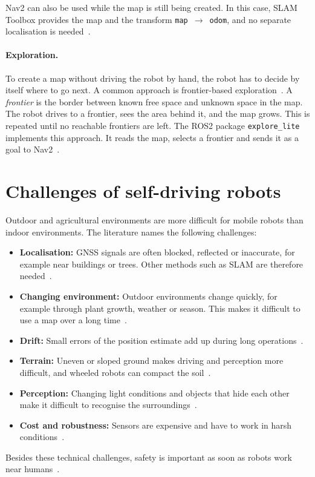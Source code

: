 Nav2 can also be used while the map is still being created. In this case, SLAM Toolbox provides the map and the transform \texttt{map}~$\rightarrow$~\texttt{odom}, and no separate localisation is needed~\citep{nav2_slam}.

\paragraph{Exploration.} To create a map without driving the robot by hand, the robot has to decide by itself where to go next. A common approach is frontier-based exploration~\citep{yamauchi1997}. A \emph{frontier} is the border between known free space and unknown space in the map. The robot drives to a frontier, sees the area behind it, and the map grows. This is repeated until no reachable frontiers are left. The ROS2 package \texttt{explore\_lite} implements this approach. It reads the map, selects a frontier and sends it as a goal to Nav2~\citep{m_explore}.

\section{Challenges of self-driving robots}
\label{sec:challenges}

Outdoor and agricultural environments are more difficult for mobile robots than indoor environments. The literature names the following challenges:
\begin{itemize}
  \item \textbf{Localisation:} GNSS signals are often blocked, reflected or inaccurate, for example near buildings or trees. Other methods such as SLAM are therefore needed~\citep{aguiar2020,oliveira2021}.
  \item \textbf{Changing environment:} Outdoor environments change quickly, for example through plant growth, weather or season. This makes it difficult to use a map over a long time~\citep{aguiar2020}.
  \item \textbf{Drift:} Small errors of the position estimate add up during long operations~\citep{aguiar2020}.
  \item \textbf{Terrain:} Uneven or sloped ground makes driving and perception more difficult, and wheeled robots can compact the soil~\citep{oliveira2021,aguiar2020}.
  \item \textbf{Perception:} Changing light conditions and objects that hide each other make it difficult to recognise the surroundings~\citep{oliveira2021,aguiar2020}.
  \item \textbf{Cost and robustness:} Sensors are expensive and have to work in harsh conditions~\citep{oliveira2021}.
\end{itemize}
Besides these technical challenges, safety is important as soon as robots work near humans~\citep{duckett2018}.
